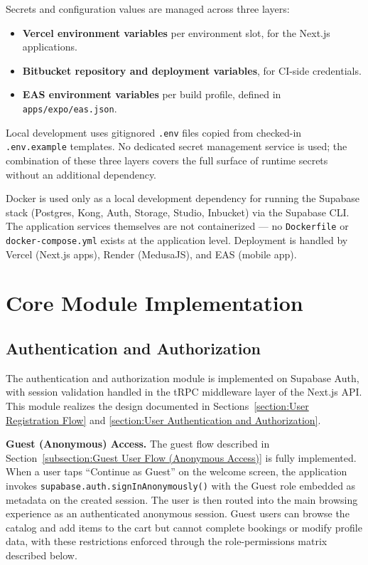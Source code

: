Secrets and configuration values are managed across three layers:

\begin{itemize}
    \item \textbf{Vercel environment variables} per environment slot, for the Next.js applications.
    \item \textbf{Bitbucket repository and deployment variables}, for CI-side credentials.
    \item \textbf{EAS environment variables} per build profile, defined in \texttt{apps/expo/eas.json}.
\end{itemize}

Local development uses gitignored \texttt{.env} files copied from checked-in \texttt{.env.example} templates. No dedicated secret management service is used; the combination of these three layers covers the full surface of runtime secrets without an additional dependency.

Docker is used only as a local development dependency for running the Supabase stack (Postgres, Kong, Auth, Storage, Studio, Inbucket) via the Supabase CLI. The application services themselves are not containerized — no \texttt{Dockerfile} or \texttt{docker-compose.yml} exists at the application level. Deployment is handled by Vercel (Next.js apps), Render (MedusaJS), and EAS (mobile app).

\section{Core Module Implementation}
\subsection{Authentication and Authorization}
The authentication and authorization module is implemented on Supabase Auth, with session validation handled in the tRPC middleware layer of the Next.js API. This module realizes the design documented in Sections~\ref{section:User Registration Flow} and \ref{section:User Authentication and Authorization}.

\textbf{Guest (Anonymous) Access.} The guest flow described in Section~\ref{subsection:Guest User Flow (Anonymous Access)} is fully implemented. When a user taps ``Continue as Guest'' on the welcome screen, the application invokes \texttt{supabase.\allowbreak auth.\allowbreak signIn\allowbreak Anonymously()} with the Guest role embedded as metadata on the created session. The user is then routed into the main browsing experience as an authenticated anonymous session. Guest users can browse the catalog and add items to the cart but cannot complete bookings or modify profile data, with these restrictions enforced through the role-permissions matrix described below.

